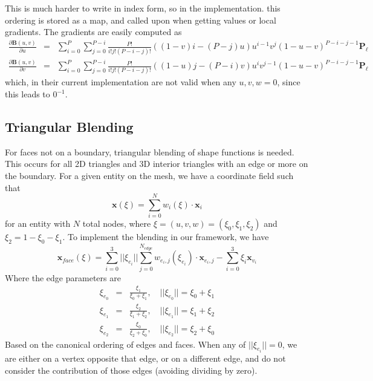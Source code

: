 \documentclass{article}
\begin{document}
This is much harder to write in index form, so in the implementation. this ordering is stored as a map, and called upon when getting values or local gradients. The gradients are easily computed as 
\begin{eqnarray*}
\frac{\partial \mathbf{B}(u,v)}{\partial u} &=& \displaystyle\sum_{i=0}^P \sum_{j=0}^{P-i}\frac{P!}{i!j!(P-i-j)!}((1-v)i-(P-j)u)u^{i-1}v^j(1-u-v)^{P-i-j-1}\mathbf{P}_\ell \\
\frac{\partial \mathbf{B}(u,v)}{\partial v} &=& \displaystyle\sum_{i=0}^P \sum_{j=0}^{P-i}\frac{P!}{i!j!(P-i-j)!}((1-u)j-(P-i)v)u^{i}v^{j-1}(1-u-v)^{P-i-j-1}\mathbf{P}_\ell
\end{eqnarray*}
which, in their current implementation are not valid when any $u,v,w = 0$, since this leads to $0^{-1}$.
\subsection{Triangular Blending}
For faces not on a boundary, triangular blending of shape functions is needed. This occurs for all 2D triangles and 3D interior triangles with an edge or more on the boundary. For a given entity on the mesh, we have a coordinate field such that 
\[ \mathbf{x}(\xi) = \sum_{i=0}^N w_i(\xi) \cdot \mathbf{x}_i \]
for an entity with $N$ total nodes, where $\xi = (u,v,w) = (\xi_0,\xi_1,\xi_2)$ and $\xi_2 = 1-\xi_0-\xi_1$. To implement the blending in our framework, we have 
\[\mathbf{x}_{face}(\xi) = \sum_{i=0}^{3}||\xi_{e_i}||\sum_{j=0}^{N_{edge}}w_{e_i,j}(\xi_{e_i})\cdot\mathbf{x}_{e_i,j}- \sum_{i=0}^{3}\xi_i\mathbf{x}_{v_i}\]
Where the edge parameters are
\begin{eqnarray*} 
\xi_{e_0} & = & \frac{\xi_1}{\xi_0+\xi_1},\quad ||\xi_{e_0}|| = \xi_0+\xi_1 \\
\xi_{e_1} & = & \frac{\xi_2}{\xi_1+\xi_2},\quad ||\xi_{e_1}|| = \xi_1+\xi_2 \\
\xi_{e_2} & = & \frac{\xi_0}{\xi_2+\xi_0},\quad ||\xi_{e_2}|| = \xi_2+\xi_0 
\end{eqnarray*}
Based on the canonical ordering of edges and faces. When any of $||\xi_{e_i}|| = 0$, we are either on a vertex opposite that edge, or on a different edge, and do not consider the contribution of those edges (avoiding dividing by zero).
\end{document}
